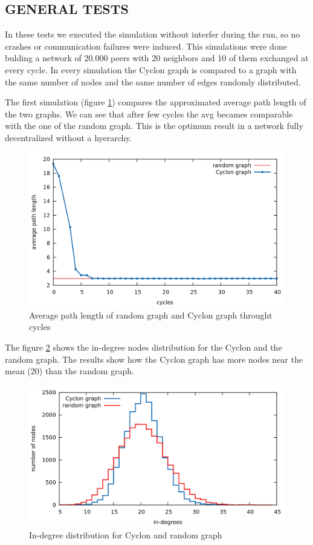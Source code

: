 \documentclass[a4paper,12pt,notitlepage]{article} %
\begin{document}
\subsection{GENERAL TESTS}

In these tests we executed the simulation without interfer during the run, so no crashes or 
 communication failures were induced. This simulations were done bulding a network of 20.000 
 peers with 20 neighbors and 10 of them exchanged at every cycle. In every simulation the Cyclon
 graph is compared to a graph with the same number of nodes and the same number of edges randomly distributed.

The first simulation  (figure \ref{avg}) compares the approximated average path length of the two graphs. We can 
 see that after few cycles the avg becames comparable with the one of the random graph. This is the 
 optimum result in a network fully decentralized without a hyerarchy.

\begin{figure} [H]
	\centering
	\includegraphics[width=1\textwidth]{img/avgplen}
	\caption{Average path length of random graph and Cyclon graph throught  cycles }
	\label{avg}
\end{figure}


The figure \ref{deg} shows the in-degree nodes distribution for the Cyclon and the random graph.
 The results show how the Cyclon graph has more nodes near the mean (20) than the random graph.

\begin{figure} [H]
	\centering
	\includegraphics[width=1\textwidth]{img/Degrees}
	\caption{In-degree distribution for Cyclon and random graph}
	\label{deg}
\end{figure}
\end{document}
